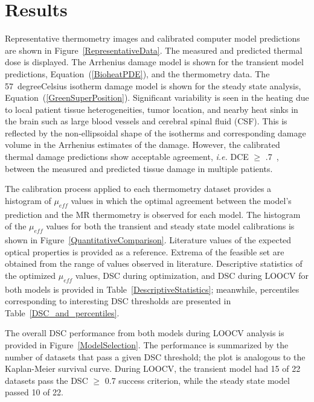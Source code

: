 \documentclass[12pt]{article}
\newcommand{\eqn}[1]{(\ref{#1})}
\begin{document}
\section{Results}

Representative thermometry images and calibrated computer model predictions are
shown in Figure~\ref{RepresentativeData}.  The measured and predicted thermal dose
is displayed. The Arrhenius damage model is shown for the transient model
predictions, Equation~\eqn{BioheatPDE}, and the thermometry data. The \SI{57}{degreeCelsius}
isotherm damage model is shown for the steady state analysis, Equation~\eqn{GreenSuperPosition}. 
Significant variability is seen in the heating due to local patient tissue heterogeneities,
tumor location, and nearby heat sinks in the brain such as large blood vessels
and cerebral spinal fluid (CSF). This is reflected by the non-ellipsoidal shape
of the isotherms and corresponding damage volume in the Arrhenius
estimates of the damage.  However, the calibrated thermal damage predictions show acceptable
agreement, \textit{i.e.} DCE $\geq$ .7~\cite{zou2004three}, between the measured and predicted
tissue damage in multiple patients. 

The calibration process applied to each thermometry dataset provides a
histogram of $\mu_\textit{eff}$ values in which the optimal agreement between
the model's prediction and the MR thermometry is observed for each model. 
The histogram of the $\mu_\textit{eff}$
values for both the transient and steady state model calibrations is shown in
Figure~\ref{QuantitativeComparison}. Literature values of the expected optical
properties is provided as a reference. 
Extrema of the feasible set are obtained
from the range of values observed in literature.
Descriptive statistics of the optimized $\mu_\textit{eff}$ values,
DSC during optimization, and DSC during LOOCV for 
both models is provided in Table~\ref{DescriptiveStatistics};
meanwhile, percentiles corresponding to interesting DSC thresholds
are presented in Table~\ref{DSC_and_percentiles}.


The overall DSC performance from both models during LOOCV analysis is
provided in Figure~\ref{ModelSelection}.
The performance is summarized by the
number of datasets that pass a given DSC threshold; the plot is
analogous to the Kaplan-Meier survival curve.
During LOOCV, the transient model had 15 of 22 datasets pass
the DSC $\geq$ 0.7 success criterion, while the steady state model
passed 10 of 22.
\end{document}
